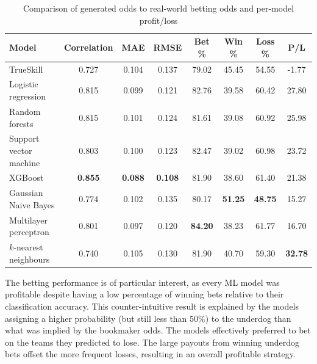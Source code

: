 \begin{table}[h!]
	\centering
	\small
	\begin{adjustbox}{center} %
		\begin{tabular}{ |l|c|c|c|c|c|c|c| }
			\hline
			\rule{0pt}{2.6ex} \textbf{Model} & \textbf{Correlation} & \textbf{MAE} & \textbf{RMSE} & \textbf{Bet \%} & \textbf{Win \%} & \textbf{Loss \%} & \textbf{P/L} \\
			\hline
			\rule{0pt}{2.6ex} TrueSkill                 & 0.727 & 0.104 & 0.137 & 79.02 & 45.45 & 54.55 & -1.77 \\ \hline
			\rule{0pt}{2.6ex} Logistic regression       & 0.815 & 0.099  & 0.121 & 82.76 & 39.58 & 60.42 & 27.80 \\
			\rule{0pt}{2.6ex} Random forests            & 0.815 & 0.101 & 0.124 & 81.61 & 39.08 & 60.92 & 25.98 \\
			\rule{0pt}{2.6ex} Support vector machine    & 0.803 & 0.100 & 0.123 & 82.47 & 39.02 & 60.98 & 23.72 \\
			\rule{0pt}{2.6ex} XGBoost                   & \textbf{0.855} &  \textbf{0.088} & \textbf{0.108} & 81.90 & 38.60 & 61.40 & 21.38 \\
			\rule{0pt}{2.6ex} Gaussian Naive Bayes      & 0.774 & 0.102 & 0.135 & 80.17 & \textbf{51.25} &\textbf{ 48.75} & 15.27 \\
			\rule{0pt}{2.6ex} Multilayer perceptron     & 0.801 & 0.097  & 0.120 & \textbf{84.20} & 38.23 & 61.77 & 16.70 \\
			\rule{0pt}{2.6ex} $k$-nearest neighbours 	& 0.740 & 0.105 & 0.130 & 81.90 & 40.70 & 59.30 & \textbf{32.78} \\
			\hline
		\end{tabular}
	\end{adjustbox}
	\caption{Comparison of generated odds to real-world betting odds and per-model profit/loss}
	\label{table:bettingperformance}
\end{table}

The betting performance is of particular interest, as every ML model was profitable despite having a low percentage of winning bets relative to their classification accuracy. This counter-intuitive result is explained by the models assigning a higher probability (but still less than 50\%) to the underdog than what was implied by the bookmaker odds. The models effectively preferred to bet on the teams they predicted to lose. The large payouts from winning underdog bets offset the more frequent losses, resulting in an overall profitable strategy.

